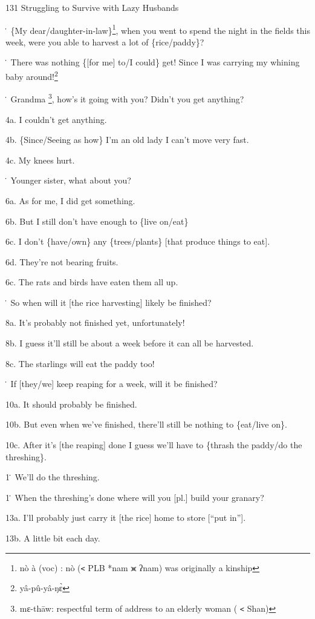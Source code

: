 
131 Struggling to Survive with Lazy Husbands

\. \{My dear/daughter-in-law\}\footnote{nò à (voc) : nò (\texttt{<} PLB *nam ⪤ ʔnam) was originally a kinship}, when you went to spend the night in the fields
this week, were you able to harvest a lot of \{rice/paddy\}?

\. There was nothing \{[for me] to/I could\} get! Since I was carrying my whining
baby around!\footnote{yâ-pû-yâ-ŋɛ̀}

\. Grandma \footnote{mɛ-thāw: respectful term of address to an elderly woman ( \texttt{<} Shan)}, how's it going with you? Didn't you get anything?

4a. I couldn't get anything.

4b. \{Since/Seeing as how\} I'm an old lady I can't move very fast.

4c. My knees hurt.

\. Younger sister, what about you?

6a. As for me, I did get something.

6b. But I still don't have enough to \{live on/eat\}

6c. I don't \{have/own\} any \{trees/plants\} [that produce things to eat].

6d. They're not bearing fruits.

6c. The rats and birds have eaten them all up.

\. So when will it [the rice harvesting] likely be finished?

8a. It's probably not finished yet, unfortunately!

8b. I guess it'll still be about a week before it can all be harvested.

8c. The starlings will eat the paddy too!

\. If [they/we] keep reaping for a week, will it be finished?

10a. It should probably be finished.

10b. But even when we've finished, there'll still be nothing to \{eat/live on\}.

10c. After it's [the reaping] done I guess we'll have to \{thrash the paddy/do
the threshing\}.

1\. We'll do the threshing.

1\. When the threshing's done where will you [pl.] build your granary?

13a. I'll probably just carry it [the rice] home to store [``put in''].

13b. A little bit each day.


